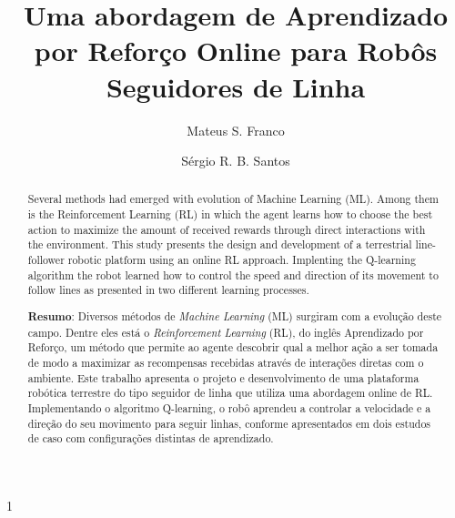 \documentclass[a4paper]{ifacconf}
\def\portugues{1}
\def\portugues{0}
\begin{document}
	
	
\if\portugues1

% 
	
\begin{frontmatter}

\title{Uma abordagem de Aprendizado por Reforço Online para Robôs Seguidores de Linha} 



\author[First]{Mateus S. Franco} 
\author[Second]{Sérgio R. B. Santos}

\address[First]{Instituto de Ciência e Tecnologia, Universidade Federal de São Paulo, SP, (e-mail: mateus.franco@unifesp.br).}
\address[Second]{Instituto de Ciência e Tecnologia, Universidade Federal de São Paulo, SP, (e-mail: sergio.ronaldo@unifesp.br).}



\renewcommand{\abstractname}{{\bf Abstract:~}}
\begin{abstract}                %
Several methods had emerged with evolution of Machine Learning (ML). Among them is the Reinforcement Learning (RL) in which the agent learns how to choose the best action to maximize the amount of received rewards through direct interactions with the environment. This study presents the design and development of a terrestrial line-follower robotic platform using an online RL approach. Implenting the Q-learning algorithm the robot learned how to control the speed and direction of its movement to follow lines as presented in two different learning processes.


\vskip 1mm%
{\noindent \bf Resumo}:  Diversos métodos de \emph{Machine Learning} (ML) surgiram com a evolução deste campo. Dentre eles está o \emph{Reinforcement Learning} (RL), do inglês Aprendizado por Reforço, um método que permite ao agente descobrir qual a melhor ação a ser tomada de modo a maximizar as recompensas recebidas através de interações diretas com o ambiente. Este trabalho apresenta o projeto e desenvolvimento de uma plataforma robótica terrestre do tipo seguidor de linha que utiliza uma abordagem online de RL. Implementando o algoritmo Q-learning, o robô aprendeu a controlar a velocidade e a direção do seu movimento para seguir linhas, conforme apresentados em dois estudos de caso com configurações distintas de aprendizado.
\end{abstract}


\end{frontmatter}
\end{document}
